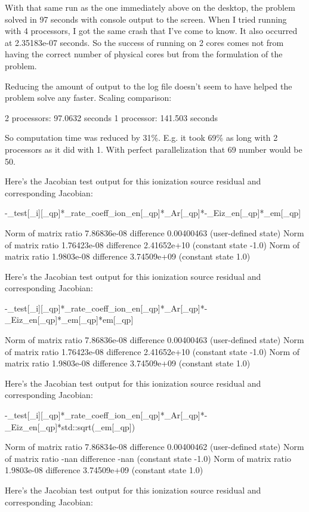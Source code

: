 With that same run as the one immediately above on the desktop, the problem solved in 97 seconds with console output to the screen. When I tried running with 4 processors, I got the same crash that I've come to know. It also occurred at 2.35183e-07 seconds. So the success of running on 2 cores comes not from having the correct number of physical cores but from the formulation of the problem.

Reducing the amount of output to the log file doesn't seem to have helped the problem solve any faster. Scaling comparison:

2 processors: 97.0632 seconds
1 processor: 141.503 seconds

So computation time was reduced by 31\%. E.g. it took 69\% as long with 2 processors as it did with 1. With perfect parallelization that 69 number would be 50.

Here's the Jacobian test output for this ionization source residual and corresponding Jacobian:

    -_test[_i][_qp]*_rate_coeff_ion_en[_qp]*_Ar[_qp]*-_Eiz_en[_qp]*_em[_qp]

Norm of matrix ratio 7.86836e-08 difference 0.00400463 (user-defined state)
Norm of matrix ratio 1.76423e-08 difference 2.41652e+10 (constant state -1.0)
Norm of matrix ratio 1.9803e-08 difference 3.74509e+09 (constant state 1.0)

Here's the Jacobian test output for this ionization source residual and corresponding Jacobian:

    -_test[_i][_qp]*_rate_coeff_ion_en[_qp]*_Ar[_qp]*-_Eiz_en[_qp]*_em[_qp]*em[_qp]

Norm of matrix ratio 7.86836e-08 difference 0.00400463 (user-defined state)
Norm of matrix ratio 1.76423e-08 difference 2.41652e+10 (constant state -1.0)
Norm of matrix ratio 1.9803e-08 difference 3.74509e+09 (constant state 1.0)

Here's the Jacobian test output for this ionization source residual and corresponding Jacobian:

    -_test[_i][_qp]*_rate_coeff_ion_en[_qp]*_Ar[_qp]*-_Eiz_en[_qp]*std::sqrt(_em[_qp])

Norm of matrix ratio 7.86834e-08 difference 0.00400462 (user-defined state)
Norm of matrix ratio -nan difference -nan (constant state -1.0)
Norm of matrix ratio 1.9803e-08 difference 3.74509e+09 (constant state 1.0)

Here's the Jacobian test output for this ionization source residual and corresponding Jacobian:

